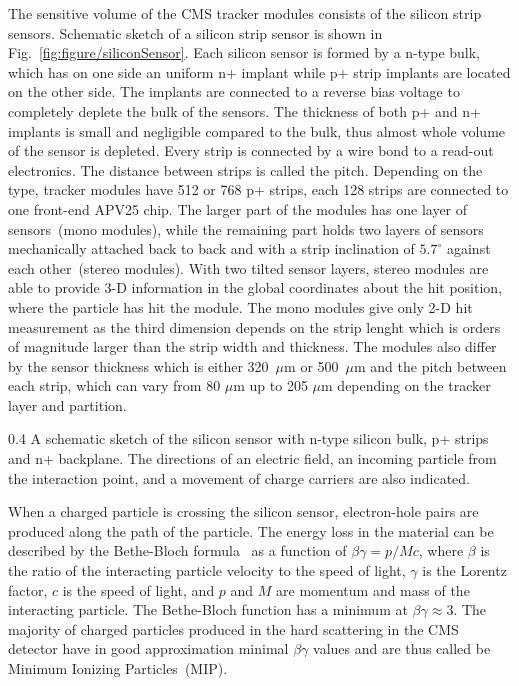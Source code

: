 The sensitive volume of the CMS tracker modules consists of the silicon strip sensors. Schematic sketch of a silicon strip sensor is shown in Fig.~\ref{fig:figure/siliconSensor}. Each silicon sensor is formed by a n-type bulk, which has on one side an uniform n+ implant while p+ strip implants are located on the other side. The implants are connected to a reverse bias voltage to completely deplete the bulk of the sensors. The thickness of both p+ and n+ implants is small and negligible compared to the bulk, thus almost whole volume of the sensor is depleted. Every strip is connected by a wire bond to a read-out electronics. The distance between strips is called the pitch. Depending on the type, tracker modules have 512 or 768 p+ strips, each 128 strips are connected to one front-end APV25 chip. The larger part of the modules has one layer of sensors~(mono modules), while the remaining part holds two layers of sensors  mechanically attached back to back and with a strip inclination of $5.7^{\circ}$ against each other~(stereo modules). With two tilted sensor layers, stereo modules are able to provide 3-D information in the global coordinates about the hit position, where the particle has hit the module. The mono modules give only 2-D hit measurement as the third dimension depends on the strip lenght which is orders of magnitude larger than the strip width and thickness. The modules also differ by the sensor thickness which is either 320~$\mu$m or 500~$\mu$m and the pitch between each strip, which can vary from 80 $\mu$m up to 205 $\mu$m depending on the tracker layer and partition.

                 {0.4}       %
                 {A schematic sketch of the silicon sensor with n-type silicon bulk, p+ strips and n+ backplane. The directions of an electric field, an incoming particle from the interaction point, and a movement of charge carriers are also indicated. } %

When a charged particle is crossing the silicon sensor, electron-hole pairs are produced along the path of the particle. The energy loss in the material can be described by the Bethe-Bloch formula~\cite{Groom:2000sm} as a function of $\beta\gamma = p/Mc$, where $\beta$ is the ratio of the interacting particle velocity to the speed of light, $\gamma$ is the Lorentz factor, $c$ is the speed of light, and $p$ and $M$ are momentum and mass of the interacting particle. The Bethe-Bloch function has a minimum at $\beta\gamma \approx 3$. The majority of charged particles produced in the hard scattering in the CMS detector have in good approximation minimal $\beta\gamma$ values and are thus called be Minimum Ionizing Particles~(MIP).

